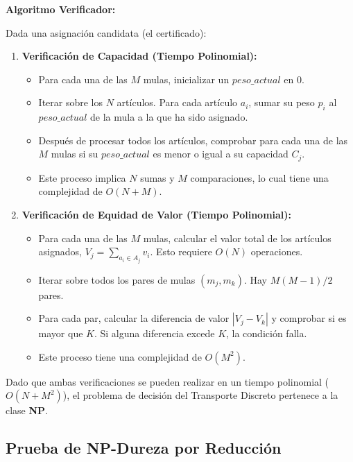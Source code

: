 \documentclass[12pt, a4paper]{article}
\begin{document}
    \textbf{Algoritmo Verificador:}

    Dada una asignación candidata (el certificado):
    \begin{enumerate}
        \item \textbf{Verificación de Capacidad (Tiempo Polinomial):}
        \begin{itemize}
            \item Para cada una de las $M$ mulas, inicializar un $peso\_actual$ en 0.
            \item Iterar sobre los $N$ artículos. Para cada artículo $a_i$, sumar su peso $p_i$ al $peso\_actual$ de la mula a la que ha sido asignado.
            \item Después de procesar todos los artículos, comprobar para cada una de las $M$ mulas si su $peso\_actual$ es menor o igual a su capacidad $C_j$.
            \item Este proceso implica $N$ sumas y $M$ comparaciones, lo cual tiene una complejidad de $O(N + M)$.
        \end{itemize}

        \item \textbf{Verificación de Equidad de Valor (Tiempo Polinomial):}
        \begin{itemize}
            \item Para cada una de las $M$ mulas, calcular el valor total de los artículos asignados, $V_j = \sum_{a_i \in A_j} v_i$. Esto requiere $O(N)$ operaciones.
            \item Iterar sobre todos los pares de mulas $(m_j, m_k)$. Hay $M(M-1)/2$ pares.
            \item Para cada par, calcular la diferencia de valor $|V_j - V_k|$ y comprobar si es mayor que $K$. Si alguna diferencia excede $K$, la condición falla.
            \item Este proceso tiene una complejidad de $O(M^2)$.
        \end{itemize}
    \end{enumerate}

    Dado que ambas verificaciones se pueden realizar en un tiempo polinomial ($O(N + M^2)$), el problema de decisión del Transporte Discreto pertenece a la clase \textbf{NP}.

    \subsection{Prueba de NP-Dureza por Reducción}
\end{document}
